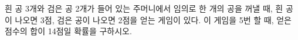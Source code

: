 흰 공 3개와 검은 공 2개가 들어 있는 주머니에서 임의로 한 개의 공을 꺼낼 때, 흰 공이 나오면 3점, 검은 공이 나오면 2점을 얻는 게임이 있다. 이 게임을 5번 할 때, 얻은 점수의 합이 14점일 확률을 구하시오. 
